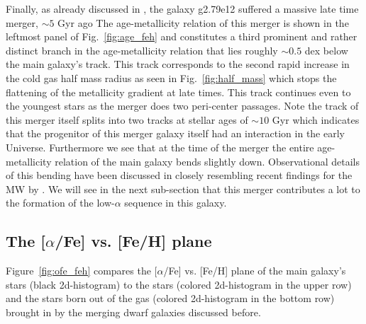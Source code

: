 \documentclass[useAMS,usenatbib]{mnras}
\begin{document}
Finally, as already discussed in \cite{Buck2020}, the galaxy g2.79e12 suffered a massive late time merger, $\sim5$ Gyr ago The age-metallicity relation of this merger is shown in the leftmost panel of Fig.~\ref{fig:age_feh} and constitutes a third prominent and rather distinct branch in the age-metallicity relation that lies roughly $\sim0.5$ dex below the main galaxy's track. This track corresponds to the second rapid increase in the cold gas half mass radius as seen in Fig.~\ref{fig:half_mass} which stops the flattening of the metallicity gradient at late times. This track continues even to the youngest stars as the merger does two peri-center passages. Note the track of this merger itself splits into two tracks at stellar ages of $\sim10$ Gyr which indicates that the progenitor of this merger galaxy itself had an interaction in the early Universe.  Furthermore we see that at the time of the merger the entire age-metallicity relation of the main galaxy bends slightly down. Observational details of this bending have been discussed in \cite{Lu2022} closely resembling recent findings for the MW by \cite{Feuillet2019}. We will see in the next sub-section that this merger contributes a lot to the formation of the low-$\alpha$ sequence in this galaxy. 


\subsection{The [$\alpha$/Fe] vs. [Fe/H] plane}
\label{sec:alpha_fe}

Figure~\ref{fig:ofe_feh} compares the [$\alpha$/Fe] vs. [Fe/H] plane of the main galaxy's stars (black 2d-histogram) to the stars (colored 2d-histogram in the upper row) and the stars born out of the gas (colored 2d-histogram in the bottom row) brought in by the merging dwarf galaxies discussed before.
\end{document}
